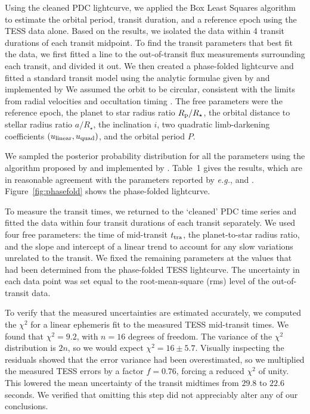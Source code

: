 \documentclass[12pt,twocolumn,tighten]{aastex62}
\begin{document}
{Using the cleaned PDC lightcurve, we applied the Box Least Squares
algorithm \citep{kovacs_box-fitting_2002} to estimate the orbital
period, transit duration, and a reference epoch using the TESS data
alone.  Based on the results, we isolated the data within 4 transit
durations of each transit midpoint.  To find the transit parameters
that best fit the data, we first fitted a line to the out-of-transit
flux measurements surrounding each transit, and divided it out.  We
then created a phase-folded lightcurve 
and fitted a standard transit model using the analytic formulae given
by \citet{mandel_analytic_2002} and implemented by
We assumed the orbit to be circular, consistent with the limits from
radial velocities and occultation timing
\citep{beerer_secondary_2011,knutson_friends_2014,bonomo_gaps_2017}.
The free parameters were the reference epoch, the planet to star
radius ratio $R_{\rm p}/R_\star$, the orbital distance to stellar
radius ratio $a/R_\star$, the inclination $i$, two quadratic
limb-darkening coefficients $(u_{\rm linear}, u_{\rm quad})$, and the
orbital period $P$.

We sampled the posterior probability distribution for all the
parameters using the algorithm proposed by
\citet{goodman_ensemble_2010} and implemented by
.
Table~1 gives the results, which are in reasonable agreement with the
parameters reported by {\it e.g.},
\citet{southworth_high-precision_2009} and
\citet{huitson_gemini_2017}.  Figure~\ref{fig:phasefold} shows the
phase-folded lightcurve.

To measure the transit times, we returned to the `cleaned' PDC time
series and fitted the data within four transit durations of each
transit separately. We used four free parameters: the time of
mid-transit $t_{\rm tra}$, the planet-to-star radius ratio, and the
slope and intercept of a linear trend to account for any slow
variations unrelated to the transit.  We fixed the remaining
parameters at the values that had been determined from the
phase-folded TESS lightcurve.  The uncertainty in each
 data point was set equal to the root-mean-square
(rms) level of the out-of-transit data.

To verify that the measured uncertainties are estimated accurately, we
computed the $\chi^2$ for a linear
ephemeris fit to the measured TESS mid-transit times.  We found that
$\chi^2 = 9.2$, with $n=16$ degrees of freedom.  The variance of the
$\chi^2$ distribution is $2n$, so we would expect $\chi^2 = 16 \pm
5.7$.  Visually inspecting the residuals showed that the error
variance had been overestimated, so we multiplied the measured TESS
errors by a factor $f=0.76$, forcing a reduced $\chi^2$ of unity.
This lowered the mean uncertainty of the transit midtimes from $29.8$
to $22.6$ seconds.  We verified that omitting this step did not
appreciably alter any of our conclusions.

}
\end{document}
